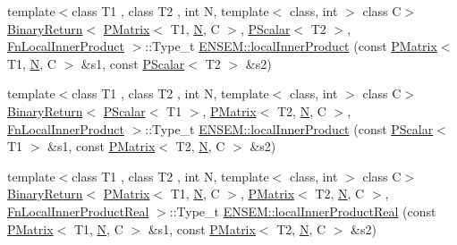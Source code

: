 \begin{DoxyCompactItemize}
\item 
{\footnotesize template$<$class T1 , class T2 , int N, template$<$ class, int $>$ class C$>$ }\\\mbox{\hyperlink{structENSEM_1_1BinaryReturn}{Binary\+Return}}$<$ \mbox{\hyperlink{classENSEM_1_1PMatrix}{P\+Matrix}}$<$ T1, \mbox{\hyperlink{operator__name__util_8cc_a7722c8ecbb62d99aee7ce68b1752f337}{N}}, C $>$, \mbox{\hyperlink{classENSEM_1_1PScalar}{P\+Scalar}}$<$ T2 $>$, \mbox{\hyperlink{structENSEM_1_1FnLocalInnerProduct}{Fn\+Local\+Inner\+Product}} $>$\+::Type\+\_\+t \mbox{\hyperlink{group__primmatrix_gafc7ce30ddacb0b13e2db237cfa268161}{E\+N\+S\+E\+M\+::local\+Inner\+Product}} (const \mbox{\hyperlink{classENSEM_1_1PMatrix}{P\+Matrix}}$<$ T1, \mbox{\hyperlink{operator__name__util_8cc_a7722c8ecbb62d99aee7ce68b1752f337}{N}}, C $>$ \&s1, const \mbox{\hyperlink{classENSEM_1_1PScalar}{P\+Scalar}}$<$ T2 $>$ \&s2)
\item 
{\footnotesize template$<$class T1 , class T2 , int N, template$<$ class, int $>$ class C$>$ }\\\mbox{\hyperlink{structENSEM_1_1BinaryReturn}{Binary\+Return}}$<$ \mbox{\hyperlink{classENSEM_1_1PScalar}{P\+Scalar}}$<$ T1 $>$, \mbox{\hyperlink{classENSEM_1_1PMatrix}{P\+Matrix}}$<$ T2, \mbox{\hyperlink{operator__name__util_8cc_a7722c8ecbb62d99aee7ce68b1752f337}{N}}, C $>$, \mbox{\hyperlink{structENSEM_1_1FnLocalInnerProduct}{Fn\+Local\+Inner\+Product}} $>$\+::Type\+\_\+t \mbox{\hyperlink{group__primmatrix_gaaa8729c59af4a03489be7e620e3dd187}{E\+N\+S\+E\+M\+::local\+Inner\+Product}} (const \mbox{\hyperlink{classENSEM_1_1PScalar}{P\+Scalar}}$<$ T1 $>$ \&s1, const \mbox{\hyperlink{classENSEM_1_1PMatrix}{P\+Matrix}}$<$ T2, \mbox{\hyperlink{operator__name__util_8cc_a7722c8ecbb62d99aee7ce68b1752f337}{N}}, C $>$ \&s2)
\item 
{\footnotesize template$<$class T1 , class T2 , int N, template$<$ class, int $>$ class C$>$ }\\\mbox{\hyperlink{structENSEM_1_1BinaryReturn}{Binary\+Return}}$<$ \mbox{\hyperlink{classENSEM_1_1PMatrix}{P\+Matrix}}$<$ T1, \mbox{\hyperlink{operator__name__util_8cc_a7722c8ecbb62d99aee7ce68b1752f337}{N}}, C $>$, \mbox{\hyperlink{classENSEM_1_1PMatrix}{P\+Matrix}}$<$ T2, \mbox{\hyperlink{operator__name__util_8cc_a7722c8ecbb62d99aee7ce68b1752f337}{N}}, C $>$, \mbox{\hyperlink{structENSEM_1_1FnLocalInnerProductReal}{Fn\+Local\+Inner\+Product\+Real}} $>$\+::Type\+\_\+t \mbox{\hyperlink{group__primmatrix_ga512767c96aa10eafdf3b60be8dd2e9bb}{E\+N\+S\+E\+M\+::local\+Inner\+Product\+Real}} (const \mbox{\hyperlink{classENSEM_1_1PMatrix}{P\+Matrix}}$<$ T1, \mbox{\hyperlink{operator__name__util_8cc_a7722c8ecbb62d99aee7ce68b1752f337}{N}}, C $>$ \&s1, const \mbox{\hyperlink{classENSEM_1_1PMatrix}{P\+Matrix}}$<$ T2, \mbox{\hyperlink{operator__name__util_8cc_a7722c8ecbb62d99aee7ce68b1752f337}{N}}, C $>$ \&s2)

\end{DoxyCompactItemize}
